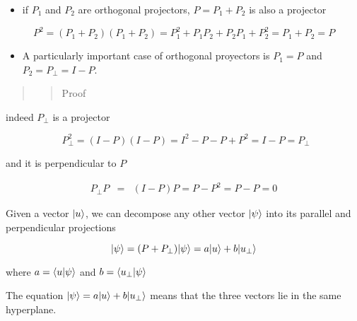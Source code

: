 \documentclass[11pt]{article}
\providecommand{\tightlist}{%
      \setlength{\itemsep}{0pt}\setlength{\parskip}{0pt}}
\begin{document}
    \begin{itemize}
\tightlist
\item
  if \(P_1\) and \(P_2\) are orthogonal projectors, \(P = P_1 + P_2\) is
  also a projector
\end{itemize}

\[
P^2 = (P_1 + P_2) (P_1 + P_2) = P_1^2 + P_1 P_2 + P_2 P_1 + P_2^2 = P_1 + P_2 = P
\]

    \begin{itemize}
\tightlist
\item
  A particularly important case of orthogonal proyectors is \(P_1 = P\)
  and \(P_2 = P_\perp = I - P\).
\end{itemize}

\begin{quote}
\begin{quote}
Proof
\end{quote}
\end{quote}

indeed \(P_\perp\) is a projector

\[~~ P_\perp^2 = (I - P)(I-P) = I^2 - P - P + P^2 = I- P = P_\perp \]

and it is perpendicular to \(P\)

\begin{eqnarray}
P_\perp P &=& (I - P) P = P - P^2 = P - P =  0 
\end{eqnarray}

    Given a vector \(|u\rangle\), we can decompose any other vector
\(|\psi\rangle\) into its parallel and perpendicular projections

\[
|\psi\rangle = ( P + P_\perp) |\psi\rangle = a |u\rangle + b |u_\perp\rangle 
\]

where \(a = \langle u|\psi\rangle\) and \(b = \langle u_\perp|\psi\rangle\)

    The equation \(|\psi\rangle = a |u\rangle + b|u_\perp\rangle\) means that the
three vectors lie in the same hyperplane.
\end{document}

